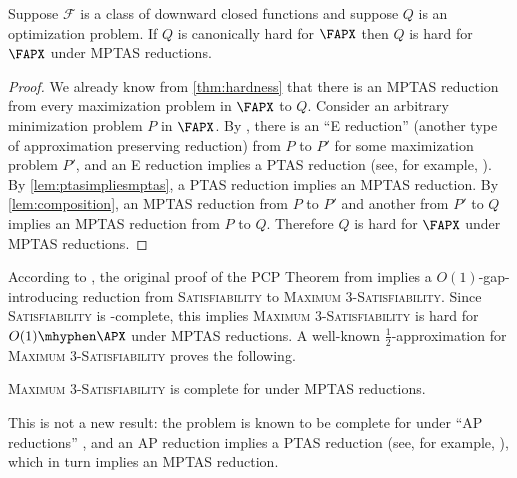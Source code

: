 \documentclass{article}
\begin{document}
\begin{corollary}[{\cite[Theorem~3]{ep06}}]
  Suppose $\mathcal{F}$ is a class of downward closed functions and suppose $Q$ is an optimization problem.
  If $Q$ is canonically hard for $\FAPX$ then $Q$ is hard for $\FAPX$ under MPTAS reductions.
\end{corollary}
\begin{proof}
  We already know from \autoref{thm:hardness} that there is an MPTAS reduction from every maximization problem in $\FAPX$ to $Q$.
  Consider an arbitrary minimization problem $P$ in $\FAPX$.
  By \cite{ep06}, there is an ``E reduction'' (another type of approximation preserving reduction) from $P$ to $P'$ for some maximization problem $P'$, and an E reduction implies a PTAS reduction (see, for example, \cite[Figure~2]{crescenzi97}).
  By \autoref{lem:ptasimpliesmptas}, a PTAS reduction implies an MPTAS reduction.
  By \autoref{lem:composition}, an MPTAS reduction from $P$ to $P'$ and another from $P'$ to $Q$ implies an MPTAS reduction from $P$ to $Q$.
  Therefore $Q$ is hard for $\FAPX$ under MPTAS reductions.
\end{proof}

According to \cite[Section~4.6]{ap06}, the original proof of the PCP Theorem from \cite{almss92} implies a $O(1)$-gap-introducing reduction from \textsc{Satisfiability} to \textsc{Maximum 3-Satisfiability}.
Since \textsc{Satisfiability} is \NP-complete, this implies \textsc{Maximum 3-Satisfiability} is hard for $O(1)\mhyphen\APX$ under MPTAS reductions.
A well-known $\frac{1}{2}$-approximation for \textsc{Maximum 3-Satisfiability} proves the following.
\begin{theorem}
  \textsc{Maximum 3-Satisfiability} is complete for \APX{} under MPTAS reductions.
\end{theorem}
This is not a new result: the problem is known to be complete for \APX{} under ``AP reductions'' \cite[Corollary~8.8]{acgkmp99}, and an AP reduction implies a PTAS reduction (see, for example, \cite[Figure~2]{crescenzi97}), which in turn implies an MPTAS reduction.

\printbibliography
\end{document}
